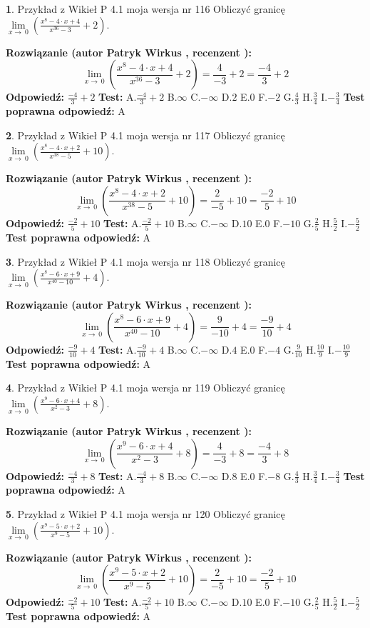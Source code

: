 \documentclass[12pt, a4paper]{article}
\theoremstyle{definition} %
\newtheorem{zad}{}
\newcommand{\zadStart}[1]{\begin{zad}#1\newline}
\newcommand{\zadStop}{\end{zad}}
\newcommand{\rozwStart}[2]{\noindent \textbf{Rozwiązanie (autor #1 , recenzent #2): }\newline}
\newcommand{\rozwStop}{\newline}
\newcommand{\odpStart}{\noindent \textbf{Odpowiedź:}\newline}
\newcommand{\odpStop}{\newline}
\newcommand{\testStart}{\noindent \textbf{Test:}\newline}
\newcommand{\testStop}{\newline}
\newcommand{\kluczStart}{\noindent \textbf{Test poprawna odpowiedź:}\newline}
\newcommand{\kluczStop}{\newline}
\begin{document}
\zadStart{Przykład z Wikieł P 4.1 moja wersja nr 116}
Obliczyć granicę $\lim\limits_{x\to\ 0}(\frac{x^{8}-4 \cdot x +4}{x^{36}-3}+2)$.
\zadStop
\rozwStart{Patryk Wirkus}{}
$$\lim\limits_{x\to\ 0}(\frac{x^{8}-4 \cdot x +4}{x^{36}-3}+2)=\frac{4}{-3}+2=\frac{-4}{3}+2$$
\rozwStop
\odpStart
$\frac{-4}{3}+2$
\odpStop
\testStart
A.$\frac{-4}{3}+2$
B.$\infty$
C.$-\infty$
D.$2$
E.$0$
F.$-2$
G.$\frac{4}{3}$
H.$\frac{3}{4}$
I.$-\frac{3}{4}$
\testStop
\kluczStart
A
\kluczStop



\zadStart{Przykład z Wikieł P 4.1 moja wersja nr 117}
Obliczyć granicę $\lim\limits_{x\to\ 0}(\frac{x^{8}-4 \cdot x +2}{x^{38}-5}+10)$.
\zadStop
\rozwStart{Patryk Wirkus}{}
$$\lim\limits_{x\to\ 0}(\frac{x^{8}-4 \cdot x +2}{x^{38}-5}+10)=\frac{2}{-5}+10=\frac{-2}{5}+10$$
\rozwStop
\odpStart
$\frac{-2}{5}+10$
\odpStop
\testStart
A.$\frac{-2}{5}+10$
B.$\infty$
C.$-\infty$
D.$10$
E.$0$
F.$-10$
G.$\frac{2}{5}$
H.$\frac{5}{2}$
I.$-\frac{5}{2}$
\testStop
\kluczStart
A
\kluczStop



\zadStart{Przykład z Wikieł P 4.1 moja wersja nr 118}
Obliczyć granicę $\lim\limits_{x\to\ 0}(\frac{x^{8}-6 \cdot x +9}{x^{40}-10}+4)$.
\zadStop
\rozwStart{Patryk Wirkus}{}
$$\lim\limits_{x\to\ 0}(\frac{x^{8}-6 \cdot x +9}{x^{40}-10}+4)=\frac{9}{-10}+4=\frac{-9}{10}+4$$
\rozwStop
\odpStart
$\frac{-9}{10}+4$
\odpStop
\testStart
A.$\frac{-9}{10}+4$
B.$\infty$
C.$-\infty$
D.$4$
E.$0$
F.$-4$
G.$\frac{9}{10}$
H.$\frac{10}{9}$
I.$-\frac{10}{9}$
\testStop
\kluczStart
A
\kluczStop



\zadStart{Przykład z Wikieł P 4.1 moja wersja nr 119}
Obliczyć granicę $\lim\limits_{x\to\ 0}(\frac{x^{9}-6 \cdot x +4}{x^{2}-3}+8)$.
\zadStop
\rozwStart{Patryk Wirkus}{}
$$\lim\limits_{x\to\ 0}(\frac{x^{9}-6 \cdot x +4}{x^{2}-3}+8)=\frac{4}{-3}+8=\frac{-4}{3}+8$$
\rozwStop
\odpStart
$\frac{-4}{3}+8$
\odpStop
\testStart
A.$\frac{-4}{3}+8$
B.$\infty$
C.$-\infty$
D.$8$
E.$0$
F.$-8$
G.$\frac{4}{3}$
H.$\frac{3}{4}$
I.$-\frac{3}{4}$
\testStop
\kluczStart
A
\kluczStop



\zadStart{Przykład z Wikieł P 4.1 moja wersja nr 120}
Obliczyć granicę $\lim\limits_{x\to\ 0}(\frac{x^{9}-5 \cdot x +2}{x^{9}-5}+10)$.
\zadStop
\rozwStart{Patryk Wirkus}{}
$$\lim\limits_{x\to\ 0}(\frac{x^{9}-5 \cdot x +2}{x^{9}-5}+10)=\frac{2}{-5}+10=\frac{-2}{5}+10$$
\rozwStop
\odpStart
$\frac{-2}{5}+10$
\odpStop
\testStart
A.$\frac{-2}{5}+10$
B.$\infty$
C.$-\infty$
D.$10$
E.$0$
F.$-10$
G.$\frac{2}{5}$
H.$\frac{5}{2}$
I.$-\frac{5}{2}$
\testStop
\kluczStart
A
\kluczStop
\end{document}
